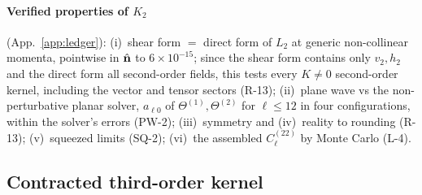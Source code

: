 \paragraph{Verified properties of $K_2$} (App.~\ref{app:ledger}): (i)~shear form $=$ direct form of $L_2$ at generic non-collinear momenta,
pointwise in $\hat{\mathbf n}$ to $6\times10^{-15}$; since the shear form contains only $v_2,h_2$ and the direct form all second-order fields, this tests every
$K\neq0$ second-order kernel, including the vector and tensor sectors (R-13); (ii)~plane wave vs the non-perturbative planar solver, $a_{\ell0}$ of
$\Theta^{(1)},\Theta^{(2)}$ for $\ell\le12$ in four configurations, within the solver's errors (PW-2); (iii)~symmetry and (iv)~reality to rounding (R-13);
(v)~squeezed limits (SQ-2); (vi)~the assembled $C^{(22)}_\ell$ by Monte Carlo (L-4).

\subsection{Contracted third-order kernel}
\label{sec:asm-K3c}
